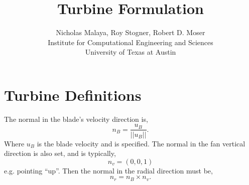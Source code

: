 \documentclass{article}
\title{\bf{Turbine Formulation}}
\author{Nicholas Malaya, Roy Stogner, Robert D. Moser \\ Institute for
Computational Engineering and Sciences \\ University of Texas at Austin}
\date{}
\begin{document}
\maketitle
\newpage
\section{Turbine Definitions}

The normal in the blade's velocity direction is, 
\begin{equation}
n_B = \frac{u_B}{||u_B||}. 
\end{equation}
Where $u_B$ is the blade velocity and is specified.
The normal in the fan vertical direction is also set, and is typically, 
\begin{equation}
n_v = \left(0,0,1\right)
\end{equation}
e.g. pointing ``up''. Then the normal in the radial direction must be, 
\begin{equation}
n_r = n_B \times n_v. 
\end{equation}

\end{document}
